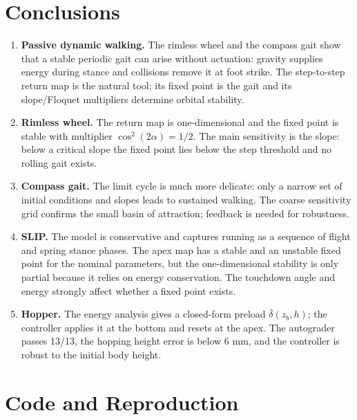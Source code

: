 \documentclass[11pt]{article}
\begin{document}
\section{Conclusions}

\begin{enumerate}[leftmargin=1.4em]
  \item \textbf{Passive dynamic walking.}  The rimless wheel and the compass
  gait show that a stable periodic gait can arise without actuation: gravity
  supplies energy during stance and collisions remove it at foot strike.  The
  step-to-step return map is the natural tool; its fixed point is the gait and
  its slope/Floquet multipliers determine orbital stability.
  \item \textbf{Rimless wheel.}  The return map is one-dimensional and the
  fixed point is stable with multiplier $\cos^2(2\alpha)=1/2$.  The main
  sensitivity is the slope: below a critical slope the fixed point lies below
  the step threshold and no rolling gait exists.
  \item \textbf{Compass gait.}  The limit cycle is much more delicate: only a
  narrow set of initial conditions and slopes leads to sustained walking.  The
  coarse sensitivity grid confirms the small basin of attraction; feedback is
  needed for robustness.
  \item \textbf{SLIP.}  The model is conservative and captures running as a
  sequence of flight and spring stance phases.  The apex map has a stable and
  an unstable fixed point for the nominal parameters, but the one-dimensional
  stability is only partial because it relies on energy conservation.  The
  touchdown angle and energy strongly affect whether a fixed point exists.
  \item \textbf{Hopper.}  The energy analysis gives a closed-form preload
  $\bar\delta(z_b,h)$; the controller applies it at the bottom and resets at
  the apex.  The autograder passes 13/13, the hopping height error is below
  6 mm, and the controller is robust to the initial body height.
\end{enumerate}

\section{Code and Reproduction}\label{sec:repro}
\end{document}
